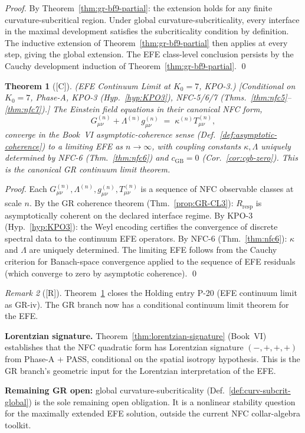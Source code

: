\documentclass[12pt,oneside]{amsbook}
\theoremstyle{plain}
\newtheorem{theorem}{Theorem}[section]
\theoremstyle{definition}
\theoremstyle{remark}
\newtheorem{remark}[theorem]{Remark}
\newcommand{\status}[1]{\textup{[#1]}}
\begin{document}
\begin{proof}
By Theorem~\ref{thm:gr-bf9-partial}: the extension holds
for any finite curvature-subcritical region. Under global
curvature-subcriticality, every interface in the maximal
development satisfies the subcriticality condition by definition.
The inductive extension of Theorem~\ref{thm:gr-bf9-partial}
then applies at every step, giving the global extension.
The EFE class-level conclusion persists by the Cauchy development
induction of Theorem~\ref{thm:gr-bf9-partial}. \qed
\end{proof}

\begin{theorem}[\status{C}]\label{thm:gr-efe-limit}
\textup{(EFE Continuum Limit at $K_0=7$, KPO-3.)}
\textup{[Conditional on $K_0=7$, Phase-A, KPO-3
(Hyp.~\ref{hyp:KPO3}), NFC-5/6/7
(Thms.~\ref{thm:nfc5}--\ref{thm:nfc7}).]}
The Einstein field equations in their canonical NFC form,
\[
 G_{\mu\nu}^{(n)} + \Lambda^{(n)} g_{\mu\nu}^{(n)}
 \;=\; \kappa^{(n)} T_{\mu\nu}^{(n)},
\]
converge in the Book~VI asymptotic-coherence sense
(Def.~\ref{def:asymptotic-coherence}) to a limiting EFE as
$n \to \infty$, with coupling constants $\kappa, \Lambda$
uniquely determined by NFC-6 (Thm.~\ref{thm:nfc6}) and
$c_{\mathrm{GB}} = 0$ (Cor.~\ref{cor:cgb-zero}).
This is the canonical GR continuum limit theorem.
\end{theorem}

\begin{proof}
Each $G_{\mu\nu}^{(n)}, \Lambda^{(n)}, g_{\mu\nu}^{(n)},
T_{\mu\nu}^{(n)}$ is a sequence of NFC observable classes at
scale $n$. By the GR coherence theorem (Thm.~\ref{prop:GR-CL3}):
$R_{\mathrm{resp}}$ is asymptotically coherent on the declared
interface regime. By KPO-3 (Hyp.~\ref{hyp:KPO3}): the Weyl
encoding certifies the convergence of discrete spectral data to
the continuum EFE operators. By NFC-6 (Thm.~\ref{thm:nfc6}):
$\kappa$ and $\Lambda$ are uniquely determined. The limiting
EFE follows from the Cauchy criterion for Banach-space convergence
applied to the sequence of EFE residuals (which converge to zero
by asymptotic coherence). \qed
\end{proof}

\begin{remark}[\status{R}]
Theorem~\ref{thm:gr-efe-limit} closes the Holding entry P-20
(EFE continuum limit as GR-iv). The GR branch now has a
conditional continuum limit theorem for the EFE.

\textbf{Lorentzian signature.} Theorem~\ref{thm:lorentzian-signature}
(Book~VI) establishes that the NFC quadratic form has Lorentzian
signature $(-,+,+,+)$ from Phase-A + PASS, conditional on
the spatial isotropy hypothesis. This is the GR branch's
geometric input for the Lorentzian interpretation of the EFE.

\textbf{Remaining GR open:} global curvature-subcriticality
(Def.~\ref{def:curv-subcrit-global}) is the sole remaining
open obligation. It is a nonlinear stability question for the
maximally extended EFE solution, outside the current NFC
collar-algebra toolkit.
\end{remark}
\end{document}
